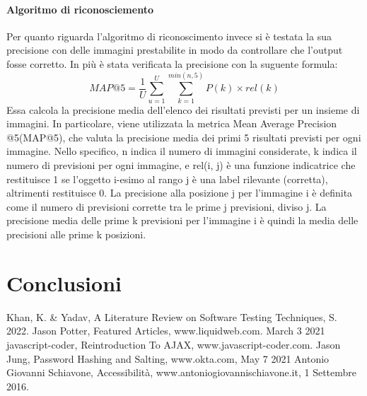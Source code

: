 \documentclass[a4paper,final,12pt]{report}
\begin{document}
\subsubsection{Algoritmo di riconosciemento}
Per quanto riguarda l'algoritmo di riconoscimento invece si è testata la sua precisione con delle immagini prestabilite in modo da controllare che l'output fosse corretto.
In più è stata verificata la precisione con la suguente formula:
\begin{equation}
MAP@5 = \frac{1}{U} \sum_{u=1}^{U} \sum_{k=1}^{min(n,5)} P(k) \times rel(k)
\end{equation}
Essa calcola la precisione media dell'elenco dei risultati previsti per un insieme di immagini. In particolare, viene utilizzata la metrica Mean Average Precision @5(MAP@5), che valuta la precisione media dei primi 5 risultati previsti per ogni immagine.
Nello specifico, n indica il numero di immagini considerate, k indica il numero di previsioni per ogni immagine, e rel(i, j) è una funzione indicatrice che restituisce 1 se l'oggetto i-esimo al rango j è una label rilevante (corretta), altrimenti restituisce 0.
La precisione alla posizione j per l'immagine i è definita come il numero di previsioni corrette tra le prime j previsioni, diviso j. La precisione media delle prime k previsioni per l'immagine i è quindi la media delle precisioni alle prime k posizioni.

\chapter{Conclusioni}




\begin{thebibliography}{100}
 Khan, K. \& Yadav, A Literature Review on Software Testing Techniques, S. 2022.
 Jason Potter, Featured Articles, www.liquidweb.com. March 3 2021
 javascript-coder, Reintroduction To AJAX, www.javascript-coder.com.
 Jason Jung, Password Hashing and Salting, www.okta.com, May 7 2021
 Antonio Giovanni Schiavone, Accessibilità, www.antoniogiovannischiavone.it, 1 Settembre 2016.
\end{thebibliography}
\end{document}
